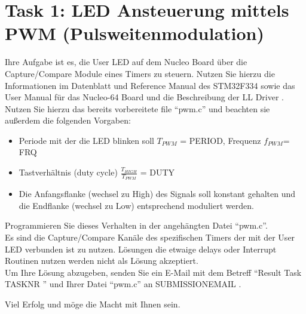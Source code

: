 \documentclass[a4paper,12pt]{article}
\begin{document}
\pagestyle{empty}
\setlength{\parindent}{0em}
\section*{Task 1: LED Ansteuerung mittels PWM (Pulsweitenmodulation)}

Ihre Aufgabe ist es, die User LED auf dem Nucleo Board über die Capture/Compare Module eines Timers zu steuern. Nutzen Sie hierzu die Informationen im Datenblatt \cite{data_sheet} und Reference Manual \cite{ref_manual} des STM32F334 sowie das User Manual für das Nucleo-64 Board \cite{nucleo_manual} und die Beschreibung der LL Driver \cite{driver_manual}. Nutzen Sie hierzu das bereits vorbereitete file \enquote{pwm.c} und beachten sie außerdem die folgenden Vorgaben:

\begin{itemize}
\item Periode mit der die LED blinken soll $T_{PWM}$ = {{PERIOD}}, Frequenz $f_{PWM}$= {{FRQ}}
\item Tastverh\"altnis (duty cycle)  $\frac{T_{HIGH}}{T_{PWM}}$ = {{DUTY}}
\item Die Anfangsflanke (wechsel zu High) des Signals soll konstant gehalten und die Endflanke (wechsel zu Low) entsprechend moduliert werden.
\end{itemize}
\vspace{0.3cm}

Programmieren Sie dieses Verhalten in der angeh\"angten Datei \enquote{pwm.c}.
\\

Es sind die Capture/Compare Kanäle des spezifischen Timers der mit der User LED verbunden ist zu nutzen. Lösungen die etwaige delays oder Interrupt Routinen nutzen werden nicht als Lösung akzeptiert.
\\

Um Ihre L\"osung abzugeben, senden Sie ein E-Mail mit dem Betreff \enquote{Result Task {{ TASKNR }}} und Ihrer Datei \enquote{pwm.c}  an {{ SUBMISSIONEMAIL }}.

\vspace{0.7cm}

Viel Erfolg und m\"oge die Macht mit Ihnen sein.

\printbibliography[heading=bibintoc]
\end{document}
